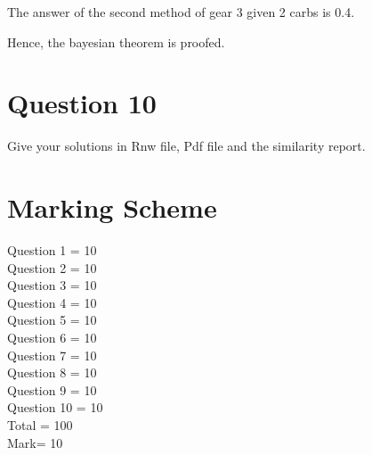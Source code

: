 \documentclass{article}\usepackage[]{graphicx}\usepackage[]{color}
\begin{document}
The answer of the second method of gear 3 given 2 carbs is 0.4.

Hence, the bayesian theorem is proofed. 

\section{Question 10}
Give your solutions in Rnw file, Pdf file and the similarity report.

\section{Marking Scheme}


 
Question 1 = 10\\
Question 2 = 10\\
Question 3 = 10\\
Question 4 = 10\\
Question 5 = 10\\
Question 6 = 10\\
Question 7 = 10\\
Question 8 = 10\\
Question 9 = 10\\
Question 10 = 10\\
Total = 100\\
Mark= 10
\end{document}
